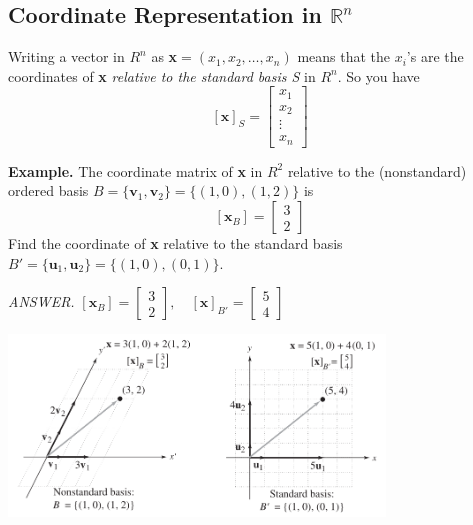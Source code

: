 \documentclass{article}
\newcommand\B{\textbf}
\begin{document}
\begin{tcolorbox}
    \subsection*{Coordinate Representation in $\mathbb{R}^n$}
    
    Writing a vector in $R^n$ as \B{x}$ = (x_1, x_2, \dots, x_n)$ means that the $x_i$'s are the coordinates of \B{x}
    \textit{relative to the standard basis S} in $R^n$. So you have 
    \[ [\B{x}]_S = \begin{bmatrix}
        x_1 \\ x_2 \\ \vdots \\ x_n 
    \end{bmatrix} \]

    \B{Example. } The coordinate matrix of \B{x} in $R^2$ relative to the (nonstandard) ordered basis 
    $B = \{ \B{v}_1, \B{v}_2 \} = \{ (1,0), (1,2) \}$ is
    \[ [\B{x}_B] = \begin{bmatrix}
        3 \\ 2
    \end{bmatrix} \]
    Find the coordinate of \B{x} relative to the standard basis $B' = \{ \B{u}_1, \B{u}_2 \} = 
    \{ (1,0), (0,1) \} $.

    \textit{ANSWER. } $[\B{x}_B] = \begin{bmatrix}
        3 \\ 2
    \end{bmatrix}, \quad [\B{x}]_{B'} = \begin{bmatrix}
        5 \\ 4
    \end{bmatrix}$

    \begin{center}
        \includegraphics[width = 10cm]{images/2degplane.png}
    \end{center}


\end{tcolorbox}
\end{document}

